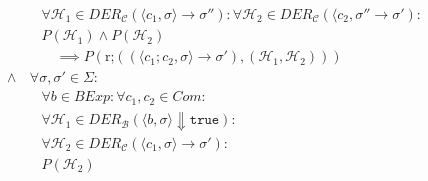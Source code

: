 \begin{align*}
																		                  & \quad \forall \mathcal{H} _ 1 \in \textit{DER} _ \mathcal{C} (\langle c _ 1, \sigma \rangle \rightarrow \sigma'') : \forall \mathcal{H} _ 2 \in \textit{DER} _ \mathcal{C} (\langle c _ 2, \sigma'' \rightarrow \sigma') : \tag{Herleitungen in Prämisse} \\
																		                  & \quad P(\mathcal{H} _ 1) \land P(\mathcal{H} _ 2) \tag{Prämisse}                                                                                                                                                                                          \\
																		                  & \quad\quad \implies P(\text{r;}((\langle c _ 1 ; c _ 2, \sigma \rangle \rightarrow \sigma'), (\mathcal{H} _ 1, \mathcal{H} _ 2))) \tag{Konklusion}                                                                                                        \\
																		\land             & \,\forall \sigma, \sigma' \in \Sigma : \tag{Zustände}                                                                                                                                                                                                     \\
																		                  & \quad \forall b \in \textit{BExp} : \forall c _ 1, c _ 2 \in \textit{Com} : \tag{Ausdrucksbestandteile}                                                                                                                                                   \\
																		                  & \quad \forall \mathcal{H} _ 1 \in \textit{DER} _ \mathcal{B} (\langle b, \sigma \rangle \Downarrow \texttt{true}) : \tag{Kalkülfremde Herleitungen}                                                                                                       \\
																		                  & \quad \forall \mathcal{H} _ 2 \in \textit{DER} _ \mathcal{C} (\langle c _ 1, \sigma \rangle \rightarrow \sigma') : \tag{Herleitungen in Prämisse}                                                                                                         \\
																		                  & \quad P(\mathcal{H} _ 2) \tag{Prämisse}                                                                                                                                                                                                                   \\

\end{align*}
